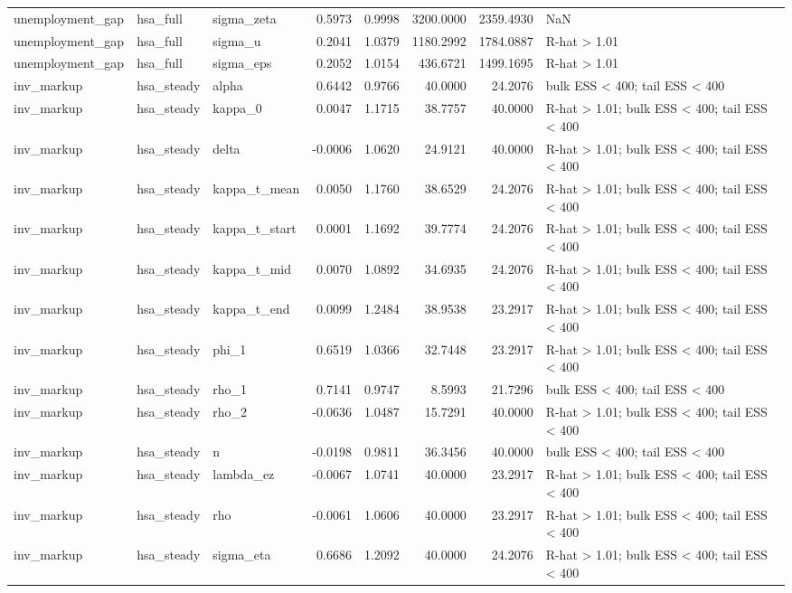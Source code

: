 \begin{tabular}{lllrrrrl}
unemployment\_gap & hsa\_full & sigma\_zeta & 0.5973 & 0.9998 & 3200.0000 & 2359.4930 & NaN \\
unemployment\_gap & hsa\_full & sigma\_u & 0.2041 & 1.0379 & 1180.2992 & 1784.0887 & R-hat > 1.01 \\
unemployment\_gap & hsa\_full & sigma\_eps & 0.2052 & 1.0154 & 436.6721 & 1499.1695 & R-hat > 1.01 \\
inv\_markup & hsa\_steady & alpha & 0.6442 & 0.9766 & 40.0000 & 24.2076 & bulk ESS < 400; tail ESS < 400 \\
inv\_markup & hsa\_steady & kappa\_0 & 0.0047 & 1.1715 & 38.7757 & 40.0000 & R-hat > 1.01; bulk ESS < 400; tail ESS < 400 \\
inv\_markup & hsa\_steady & delta & -0.0006 & 1.0620 & 24.9121 & 40.0000 & R-hat > 1.01; bulk ESS < 400; tail ESS < 400 \\
inv\_markup & hsa\_steady & kappa\_t\_mean & 0.0050 & 1.1760 & 38.6529 & 24.2076 & R-hat > 1.01; bulk ESS < 400; tail ESS < 400 \\
inv\_markup & hsa\_steady & kappa\_t\_start & 0.0001 & 1.1692 & 39.7774 & 24.2076 & R-hat > 1.01; bulk ESS < 400; tail ESS < 400 \\
inv\_markup & hsa\_steady & kappa\_t\_mid & 0.0070 & 1.0892 & 34.6935 & 24.2076 & R-hat > 1.01; bulk ESS < 400; tail ESS < 400 \\
inv\_markup & hsa\_steady & kappa\_t\_end & 0.0099 & 1.2484 & 38.9538 & 23.2917 & R-hat > 1.01; bulk ESS < 400; tail ESS < 400 \\
inv\_markup & hsa\_steady & phi\_1 & 0.6519 & 1.0366 & 32.7448 & 23.2917 & R-hat > 1.01; bulk ESS < 400; tail ESS < 400 \\
inv\_markup & hsa\_steady & rho\_1 & 0.7141 & 0.9747 & 8.5993 & 21.7296 & bulk ESS < 400; tail ESS < 400 \\
inv\_markup & hsa\_steady & rho\_2 & -0.0636 & 1.0487 & 15.7291 & 40.0000 & R-hat > 1.01; bulk ESS < 400; tail ESS < 400 \\
inv\_markup & hsa\_steady & n & -0.0198 & 0.9811 & 36.3456 & 40.0000 & bulk ESS < 400; tail ESS < 400 \\
inv\_markup & hsa\_steady & lambda\_ez & -0.0067 & 1.0741 & 40.0000 & 23.2917 & R-hat > 1.01; bulk ESS < 400; tail ESS < 400 \\
inv\_markup & hsa\_steady & rho & -0.0061 & 1.0606 & 40.0000 & 23.2917 & R-hat > 1.01; bulk ESS < 400; tail ESS < 400 \\
inv\_markup & hsa\_steady & sigma\_eta & 0.6686 & 1.2092 & 40.0000 & 24.2076 & R-hat > 1.01; bulk ESS < 400; tail ESS < 400 \\

\end{tabular}
